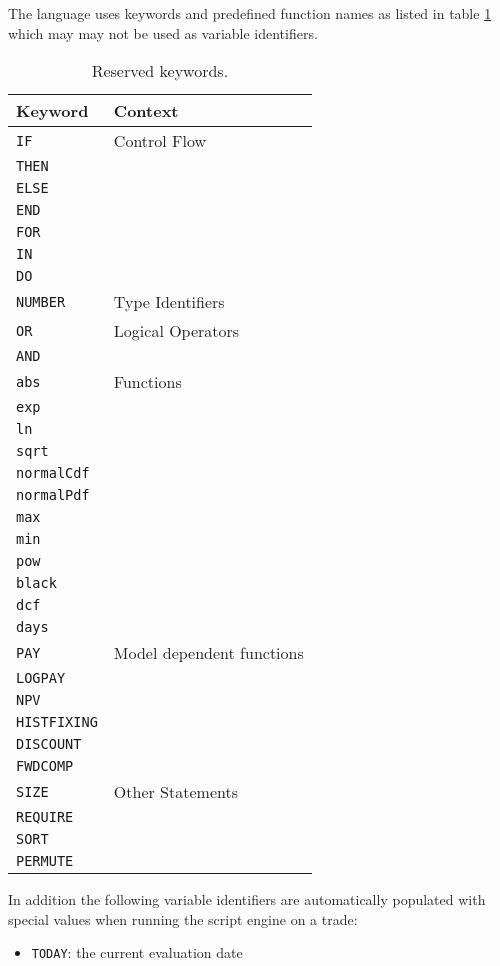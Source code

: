 The language uses keywords and predefined function names as listed in table \ref{tab:keywords} which may may not be used as
variable identifiers.

\begin{table}[!htbp]
  \begin{tabular}{l | l}
    Keyword & Context\\ \hline
    \verb+IF+ & Control Flow \\
    \verb+THEN+ & \\
    \verb+ELSE+ & \\
    \verb+END+ & \\
    \verb+FOR+ & \\
    \verb+IN+ & \\
    \verb+DO+ & \\ \hline
    \verb+NUMBER+ & Type Identifiers \\ \hline
    \verb+OR+ & Logical Operators \\
    \verb+AND+ & \\ \hline
    \verb+abs+ & Functions\\
    \verb+exp+ & \\
    \verb+ln+ & \\
    \verb+sqrt+ & \\
    \verb+normalCdf+ & \\
    \verb+normalPdf+ & \\
    \verb+max+ & \\
    \verb+min+ & \\
    \verb+pow+ & \\
    \verb+black+ & \\
    \verb+dcf+ & \\
    \verb+days+ & \\ \hline
    \verb+PAY+ & Model dependent functions\\
    \verb+LOGPAY+ & \\
    \verb+NPV+ & \\
    \verb+HISTFIXING+ & \\
    \verb+DISCOUNT+ & \\
    \verb+FWDCOMP+ & \\ \hline
    \verb+SIZE+ & Other Statements \\
    \verb+REQUIRE+ &  \\
    \verb+SORT+ & \\
    \verb+PERMUTE+ & \\
  \end{tabular}
  \caption{Reserved keywords.}
  \label{tab:keywords}
\end{table}

In addition the following variable identifiers are automatically populated with special values when running the script
engine on a trade:

\begin{itemize}
\item \verb+TODAY+: the current evaluation date
\end{itemize}
